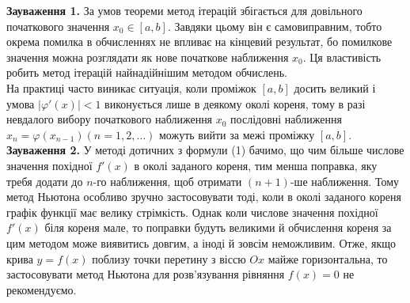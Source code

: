 \documentclass[14pt,a4paper,titlepage]{extarticle}
\begin{document}
\textbf{Зауваження 1.} За умов теореми метод ітерацій збігається для довільного початкового значення $x_0 \in [a, b]$. Завдяки цьому він є самовиправним, тобто окрема помилка в обчисленнях не впливає на кінцевий результат, бо помилкове значення можна розглядати як нове початкове наближення $x_0$. Ця властивість робить метод ітерацій найнадійнішим методом обчислень.\\
На практиці часто виникає ситуація, коли проміжок $[a, b]$ досить великий і умова $|\varphi'(x)| < 1$ виконується лише в деякому околі кореня, тому в разі невдалого вибору початкового наближення $x_0$ послідовні наближення $x_n = \varphi(x_{n-1})(n = 1, 2, \ldots)$ можуть вийти за межі проміжку $[a, b]$.\\
\textbf{Зауваження 2.} У методі дотичних з формули (1) бачимо, що чим більше числове значення похідної $f'(x)$ в околі заданого кореня, тим менша поправка, яку требя додати до $n$-го наближення, щоб отримати $(n+1)$-ше наближення. Тому метод Ньютона особливо зручно застосовувати тоді, коли в околі заданого кореня графік функції має велику стрімкість. Однак коли числове значення похідної $f'(x)$ біля кореня мале, то поправки будуть великими й обчислення кореня за цим методом може виявитись довгим, а іноді й зовсім неможливим. Отже, якщо крива $y = f(x)$ поблизу точки перетину з віссю $Ox$ майже горизонтальна, то застосовувати метод Ньютона для розв'язування рівняння $f(x) = 0$ не рекомендуємо.
\end{document}
